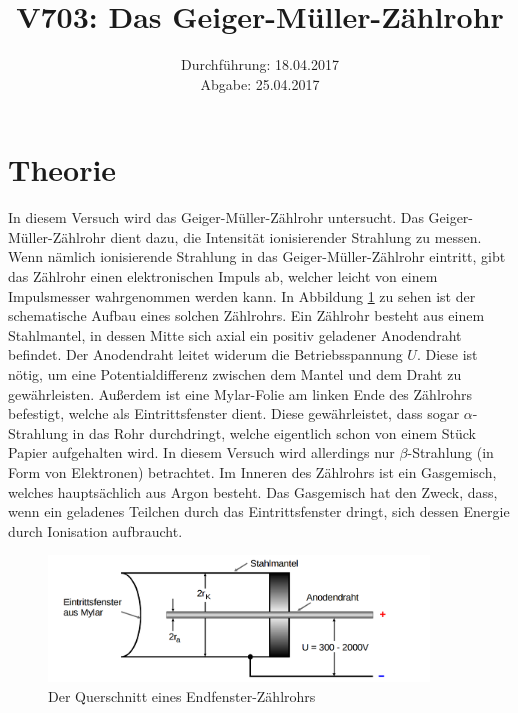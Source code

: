 \documentclass[
  bibliography=totoc,     %
  captions=tableheading,  %
  titlepage=firstiscover, %
]{scrartcl}
\title{V703: Das Geiger-Müller-Zählrohr}
\author{
  Simon Schulte
  \texorpdfstring{
    \\
    \href{mailto:simon.schulte@udo.edu}{simon.schulte@udo.edu}
  }{}
  \texorpdfstring{\and}{, }
  Tim Sedlaczek
  \texorpdfstring{
    \\
    \href{mailto:tim.sedlaczek@udo.edu}{tim.sedlaczek@udo.edu}
  }{}
}
\date{Durchführung: 18.04.2017\\
      Abgabe: 25.04.2017}
\begin{document}
\maketitle
\thispagestyle{empty}
\tableofcontents
\newpage
\section{Theorie}
\label{sec:theorie}
In diesem Versuch wird das Geiger-Müller-Zählrohr untersucht. Das
Geiger-Müller-Zählrohr dient dazu, die Intensität ionisierender Strahlung zu
messen. Wenn nämlich ionisierende Strahlung in das Geiger-Müller-Zählrohr
eintritt, gibt das Zählrohr einen elektronischen Impuls ab, welcher leicht von
einem Impulsmesser wahrgenommen werden kann.
In Abbildung \ref{fig:V7031} zu sehen ist der schematische Aufbau eines
solchen Zählrohrs. Ein Zählrohr besteht aus einem Stahlmantel, in dessen
Mitte sich axial ein positiv geladener Anodendraht befindet. Der Anodendraht
leitet widerum die Betriebsspannung $U$. Diese ist nötig, um eine
Potentialdifferenz zwischen dem Mantel und dem Draht zu gewährleisten. Außerdem
ist eine Mylar-Folie am linken Ende des Zählrohrs befestigt, welche als
Eintrittsfenster dient. Diese gewährleistet, dass sogar $\alpha$-Strahlung in
das Rohr durchdringt, welche eigentlich schon von einem Stück Papier aufgehalten
wird. In diesem Versuch wird allerdings nur $\beta$-Strahlung (in Form von Elektronen)
betrachtet. Im Inneren des Zählrohrs ist ein Gasgemisch, welches hauptsächlich aus
Argon besteht. Das Gasgemisch hat den Zweck, dass, wenn ein geladenes Teilchen durch
das Eintrittsfenster dringt, sich dessen Energie durch Ionisation aufbraucht.
\begin{figure}[htb]
  \centering
  \includegraphics[width=0.9\textwidth]{V7031.png}
  \caption{Der Querschnitt eines Endfenster-Zählrohrs}
  \label{fig:V7031}
\end{figure}
\end{document}

